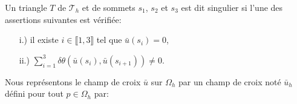 \begin{definition}
\label{def:triangle_singulier}
 Un triangle $T$ de $\mathcal{T}_h$ et de sommets $s_1$, $s_2$ et $s_3$ est dit singulier si l'une des assertions suivantes est vérifiée:\\[-0.2cm]
 \begin{itemize}
  \item[i.)] il existe $i\in\llbracket 1, 3\rrbracket$ tel que $\bar{u}(s_i)=0$,\\[-0.2cm]
  \item[ii.)] $\sum_{i=1}^3\delta\theta(\bar{u}(s_i),\bar{u}(s_{i+1}))\neq 0$.
 \end{itemize}

\end{definition}
Nous représentons le champ de croix $\bar{u}$ sur $\Omega_h$ par un champ de croix noté $\bar{u}_h$ défini pour tout $p\in\Omega_h$ par:\\
